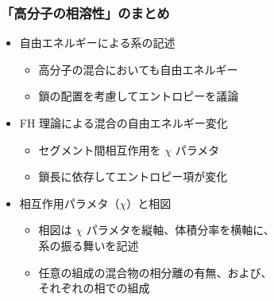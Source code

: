 \documentclass[12pt, dvipdfmx]{beamer}
\begin{document}
\begin{frame}
	\frametitle{「高分子の相溶性」のまとめ}
        \begin{boxnote}
            \vspace{-3mm}
            \begin{itemize}
                \item 自由エネルギーによる系の記述
                    \begin{itemize}
                        \item 高分子の混合においても自由エネルギー
                        \item 鎖の配置を考慮してエントロピーを議論
                    \end{itemize} 
                \item FH 理論による混合の自由エネルギー変化
                    \begin{itemize}
                        \item セグメント間相互作用を $\chi$ パラメタ
                        \item 鎖長に依存してエントロピー項が変化
                    \end{itemize} 
                \item 相互作用パラメタ（$\chi$）と相図
                    \begin{itemize}
                        \item 相図は $\chi$ パラメタを縦軸、体積分率を横軸に、\\系の振る舞いを記述
                        \item 任意の組成の混合物の相分離の有無、および、\\それぞれの相での組成
                    \end{itemize}
            \end{itemize}
        \end{boxnote}
\end{frame}
\end{document}
